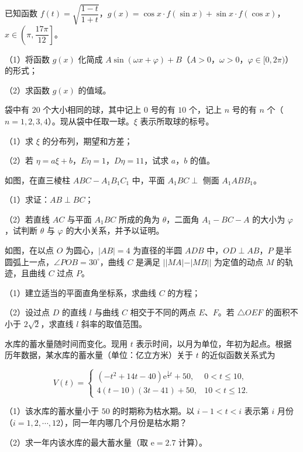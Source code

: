 \begin{question}
已知函数 $f(t)=\sqrt{\dfrac{1-t}{1+t}}$，$g(x)=\cos x\cdot f(\sin x)+\sin x\cdot f(\cos x)$，$x\in\left(\pi,\dfrac{17\pi}{12}\right]$。

（1）将函数 $g(x)$ 化简成 $A\sin(\omega x+\varphi)+B$（$A>0$，$\omega>0$，$\varphi\in[0,2\pi)$）的形式；

（2）求函数 $g(x)$ 的值域。

\end{question}
\begin{question}
袋中有 $20$ 个大小相同的球，其中记上 $0$ 号的有 $10$ 个，记上 $n$ 号的有 $n$ 个（$n=1,2,3,4$）。现从袋中任取一球。$\xi$ 表示所取球的标号。

（1）求 $\xi$ 的分布列，期望和方差；

（2）若 $\eta=a\xi+b$，$E\eta=1$，$D\eta=11$，试求 $a$，$b$ 的值。

\Needspace{0.4\textheight}
\end{question}
\begin{question}
如图，在直三棱柱 $ABC-A_1B_1C_1$ 中，平面 $A_1BC\perp$ 侧面 $A_1ABB_1$。

（1）求证：$AB\perp BC$；

（2）若直线 $AC$ 与平面 $A_1BC$ 所成的角为 $\theta$，二面角 $A_1-BC-A$ 的大小为 $\varphi$，试判断 $\theta$ 与 $\varphi$ 的大小关系，并予以证明。
\nopagebreak[4]
\begin{center}\end{center}
\nopagebreak[4]
\Needspace{0.4\textheight}
\end{question}
\begin{question}
如图，在以点 $O$ 为圆心，$|AB|=4$ 为直径的半圆 $ADB$ 中，$OD\perp AB$，$P$ 是半圆弧上一点，$\angle POB=30^\circ$，曲线 $C$ 是满足 $||MA|-|MB||$ 为定值的动点 $M$ 的轨迹，且曲线 $C$ 过点 $P$。

（1）建立适当的平面直角坐标系，求曲线 $C$ 的方程；

（2）设过点 $D$ 的直线 $l$ 与曲线 $C$ 相交于不同的两点 $E$、$F$。若 $\triangle OEF$ 的面积不小于 $2\sqrt2$，求直线 $l$ 斜率的取值范围。
\nopagebreak[4]
\begin{center}\end{center}
\nopagebreak[4]
\end{question}
\begin{question}
水库的蓄水量随时间而变化。现用 $t$ 表示时间，以月为单位，年初为起点。根据历年数据，某水库的蓄水量（单位：亿立方米）关于 $t$ 的近似函数关系式为

\nopagebreak[4]
\[V(t)=\begin{cases}(-t^2+14t-40)\mathrm e^{\frac14t}+50,&0<t\leqslant10,\\ 4(t-10)(3t-41)+50,&10<t\leqslant12.\end{cases}\]

（1）该水库的蓄水量小于 $50$ 的时期称为枯水期。以 $i-1<t<i$ 表示第 $i$ 月份（$i=1,2,\cdots,12$），同一年内哪几个月份是枯水期？

（2）求一年内该水库的最大蓄水量（取 $\mathrm e=2.7$ 计算）。

\end{question}
